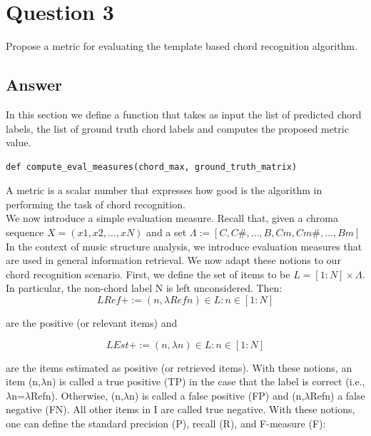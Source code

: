 \documentclass[
	12pt, %
]{fphw}
\begin{document}

\section*{Question 3}

\begin{problem}
	Propose a metric for evaluating the template based chord recognition algorithm.
\end{problem}

\subsection*{Answer}

In this section we define a function that takes as input the list of predicted chord labels, the list of ground truth chord labels and computes the proposed metric value.
\begin{lstlisting}
def compute_eval_measures(chord_max, ground_truth_matrix)
\end{lstlisting}
A metric is a scalar number that expresses how good is the algorithm in performing the task of chord recognition.\\

We now introduce a simple evaluation measure. Recall that, given a chroma sequence \(X=(x1,x2,…,xN)\) and a set \( \Lambda :=[C,C\#,…,B,Cm,Cm\#,…,Bm] \)\\

In the context of music structure analysis, we introduce evaluation measures that are used in general information retrieval. We now adapt these notions to our chord recognition scenario. First, we define the set of items to be \(L=[1:N]×\Lambda\). In particular, the non-chord label N is left unconsidered. Then:
\[LRef+:={(n,\lambda Refn) \in L:n\in[1:N]}\]

are the positive (or relevant items) and

\[LEst+:={(n,\lambda n) \in L:n\in[1:N]}\]

are the items estimated as positive (or retrieved items). With these notions, an item (n,$\lambda$n) is called a true positive (TP) in the case that the label is correct (i.e., $\lambda$n=$\lambda$Refn). Otherwise, (n,$\lambda$n) is called a false positive (FP) and (n,$\lambda$Refn) a false negative (FN). All other items in I are called true negative. With these notions, one can define the standard precision (P), recall (R), and F-measure (F):
\end{document}
